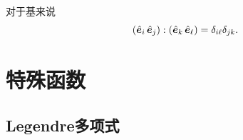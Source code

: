 \begin{corollary}
    对于基来说
    \begin{equation}
        (\mathop{}\!\hat{\bm{e}}_i\mathop{}\!\hat{\bm{e}}_j):(\mathop{}\!\hat{\bm{e}}_k\mathop{}\!\hat{\bm{e}}_\ell) = \delta_{i\ell}\delta_{jk}.
    \end{equation}
\end{corollary}

\chapter{特殊函数}

\section{Legendre多项式}
\label{sec:Legendre polynomial}

